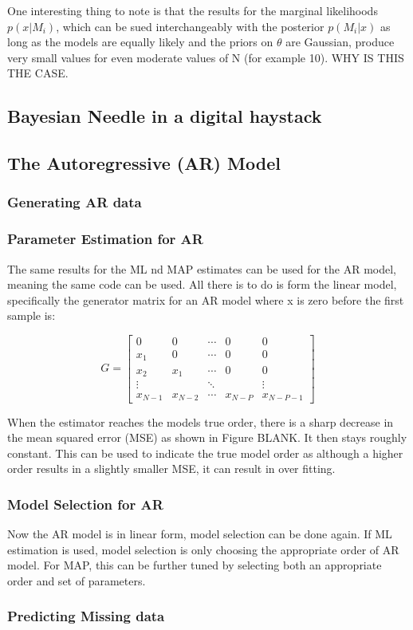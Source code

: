 \documentclass[12pt]{article}
\begin{document}
One interesting thing to note is that the results for the marginal likelihoods $p(x|M_i)$, which can be sued interchangeably with the posterior $p(M_i|x)$ as long as the models are equally likely and the priors on $\theta$ are Gaussian, produce very small values for even moderate values of N (for example 10). WHY IS THIS THE CASE.
\subsection{Bayesian Needle in a digital haystack}

\subsection{The Autoregressive (AR) Model}
\subsubsection{Generating AR data}
\subsubsection{Parameter Estimation for AR}
The same results for the ML nd MAP estimates can be used for the AR model, meaning the same code can be used. All there is to do is form the linear model, specifically the generator matrix for an AR model where x is zero before the first sample is:

\[ 
G = 
\begin{bmatrix}
0   & 0   & \cdots & 0 & 0 \\
x_1 & 0   & \cdots & 0 & 0 \\
x_2 & x_1 & \cdots & 0 & 0 \\
\vdots &     & \ddots &   & \vdots  \\
x_{N-1 }  & x_{N-2} & \cdots & x_{N-P} & x_{N-P-1}   
\end{bmatrix}
\]

When the estimator reaches the models true order, there is a sharp decrease in the mean squared error (MSE) as shown in Figure BLANK. It then stays roughly constant. This can be used to indicate the true model order as although a higher order results in a slightly smaller MSE, it can result in over fitting.

\subsubsection{Model Selection for AR}
Now the AR model is in linear form, model selection can be done again. If ML estimation is used, model selection is only choosing the appropriate order of AR model. For MAP, this can be further tuned by selecting both an appropriate order and set of parameters.
\subsubsection{Predicting Missing data}
\end{document}
